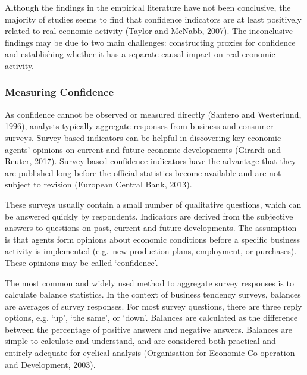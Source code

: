 \documentclass[11pt,]{article}
\begin{document}
Although the findings in the empirical literature have not been
conclusive, the majority of studies seems to find that confidence
indicators are at least positively related to real economic activity
(Taylor and McNabb, 2007). The inconclusive findings may be due to two
main challenges: constructing proxies for confidence and establishing
whether it has a separate causal impact on real economic activity.

\subsubsection{Measuring Confidence}\label{measuring-confidence}

As confidence cannot be observed or measured directly (Santero and
Westerlund, 1996), analysts typically aggregate responses from business
and consumer surveys. Survey-based indicators can be helpful in
discovering key economic agents' opinions on current and future economic
developments (Girardi and Reuter, 2017). Survey-based confidence
indicators have the advantage that they are published long before the
official statistics become available and are not subject to revision
(European Central Bank, 2013).

These surveys usually contain a small number of qualitative questions,
which can be answered quickly by respondents. Indicators are derived
from the subjective answers to questions on past, current and future
developments. The assumption is that agents form opinions about economic
conditions before a specific business activity is implemented (e.g.~new
production plans, employment, or purchases). These opinions may be
called `confidence'.

The most common and widely used method to aggregate survey responses is
to calculate balance statistics. In the context of business tendency
surveys, balances are averages of survey responses. For most survey
questions, there are three reply options, e.g. `up', `the same', or
`down'. Balances are calculated as the difference between the percentage
of positive answers and negative answers. Balances are simple to
calculate and understand, and are considered both practical and entirely
adequate for cyclical analysis (Organisation for Economic Co-operation
and Development, 2003).
\end{document}
